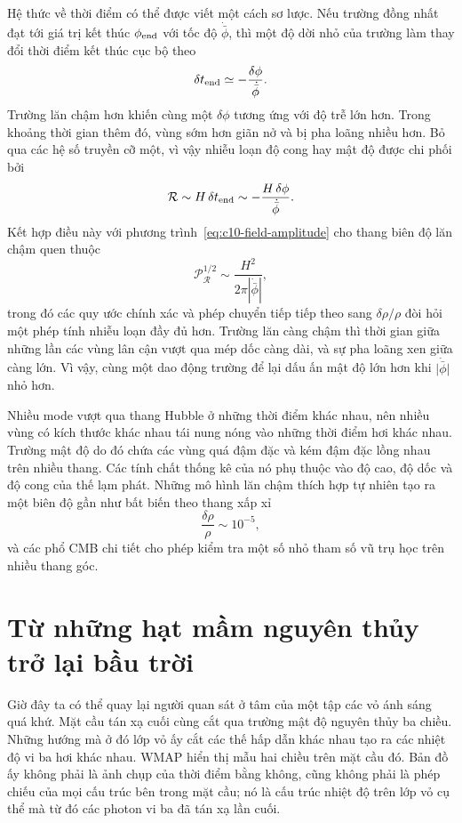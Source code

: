 Hệ thức về thời điểm có thể được viết một cách sơ lược. Nếu trường đồng nhất đạt tới giá trị kết thúc \(\phi_{\rm end}\) với tốc độ \(\dot{\bar\phi}\), thì một độ dời nhỏ của trường làm thay đổi thời điểm kết thúc cục bộ theo
\begin{equation}
\delta t_{\rm end}
\simeq-\frac{\delta\phi}{\dot{\bar\phi}}.
\label{eq:c10-time-delay}
\end{equation}
Trường lăn chậm hơn khiến cùng một \(\delta\phi\) tương ứng với độ trễ lớn hơn. Trong khoảng thời gian thêm đó, vùng sớm hơn giãn nở và bị pha loãng nhiều hơn. Bỏ qua các hệ số truyền cỡ một, vì vậy nhiễu loạn độ cong hay mật độ được chi phối bởi
\begin{equation}
\mathcal R
\sim H\,\delta t_{\rm end}
\sim-\frac{H\,\delta\phi}{\dot{\bar\phi}}.
\label{eq:c10-curvature-estimate}
\end{equation}
Kết hợp điều này với phương trình~\eqref{eq:c10-field-amplitude} cho thang biên độ lăn chậm quen thuộc
\begin{equation}
\mathcal P_{\mathcal R}^{1/2}
\sim\frac{H^2}{2\pi|\dot{\bar\phi}|},
\label{eq:c10-slow-roll-amplitude}
\end{equation}
trong đó các quy ước chính xác và phép chuyển tiếp tiếp theo sang \(\delta\rho/\rho\) đòi hỏi một phép tính nhiễu loạn đầy đủ hơn. Trường lăn càng chậm thì thời gian giữa những lần các vùng lân cận vượt qua mép dốc càng dài, và sự pha loãng xen giữa càng lớn. Vì vậy, cùng một dao động trường để lại dấu ấn mật độ lớn hơn khi \(\lvert\dot{\bar\phi}\rvert\) nhỏ hơn.

Nhiều mode vượt qua thang Hubble ở những thời điểm khác nhau, nên nhiều vùng có kích thước khác nhau tái nung nóng vào những thời điểm hơi khác nhau. Trường mật độ do đó chứa các vùng quá đậm đặc và kém đậm đặc lồng nhau trên nhiều thang. Các tính chất thống kê của nó phụ thuộc vào độ cao, độ dốc và độ cong của thế lạm phát. Những mô hình lăn chậm thích hợp tự nhiên tạo ra một biên độ gần như bất biến theo thang xấp xỉ
\[
\frac{\delta\rho}{\rho}\sim10^{-5},
\]
và các phổ CMB chi tiết cho phép kiểm tra một số nhỏ tham số vũ trụ học trên nhiều thang góc.

\section{Từ những hạt mầm nguyên thủy trở lại bầu trời}

Giờ đây ta có thể quay lại người quan sát ở tâm của một tập các vỏ ánh sáng quá khứ. Mặt cầu tán xạ cuối cùng cắt qua trường mật độ nguyên thủy ba chiều. Những hướng mà ở đó lớp vỏ ấy cắt các thế hấp dẫn khác nhau tạo ra các nhiệt độ vi ba hơi khác nhau. WMAP hiển thị mẫu hai chiều trên mặt cầu đó. Bản đồ ấy không phải là ảnh chụp của thời điểm bằng không, cũng không phải là phép chiếu của mọi cấu trúc bên trong mặt cầu; nó là cấu trúc nhiệt độ trên lớp vỏ cụ thể mà từ đó các photon vi ba đã tán xạ lần cuối.

